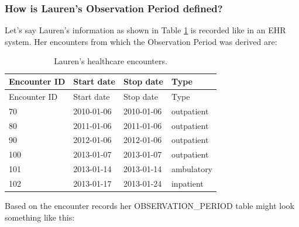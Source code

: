 \documentclass[11pt]{book}
\theoremstyle{definition}
\theoremstyle{definition}
\theoremstyle{definition}
\theoremstyle{remark}
\begin{document}
\hypertarget{how-is-laurens-observation-period-defined}{%
\subsubsection*{How is Lauren's Observation Period defined?}\label{how-is-laurens-observation-period-defined}}

Let's say Lauren's information as shown in Table \ref{tab:encounters} is recorded like in an EHR system. Her encounters from which the Observation Period was derived are:

\begin{longtable}[]{@{}llll@{}}
\caption{\label{tab:encounters} Lauren's healthcare encounters.}\tabularnewline
\toprule
Encounter ID & Start date & Stop date & Type\tabularnewline
\midrule
\endfirsthead
\toprule
Encounter ID & Start date & Stop date & Type\tabularnewline
\midrule
\endhead
70 & 2010-01-06 & 2010-01-06 & outpatient\tabularnewline
80 & 2011-01-06 & 2011-01-06 & outpatient\tabularnewline
90 & 2012-01-06 & 2012-01-06 & outpatient\tabularnewline
100 & 2013-01-07 & 2013-01-07 & outpatient\tabularnewline
101 & 2013-01-14 & 2013-01-14 & ambulatory\tabularnewline
102 & 2013-01-17 & 2013-01-24 & inpatient\tabularnewline
\bottomrule
\end{longtable}

Based on the encounter records her OBSERVATION\_PERIOD table might look something like this:
\end{document}

